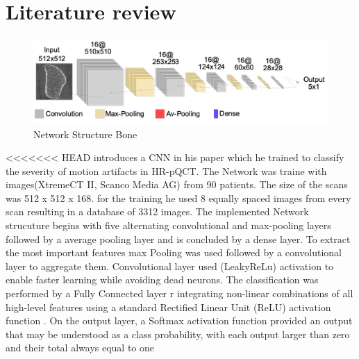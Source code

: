 \documentclass[
a4paper, 
12pt,
grayscalebody, %
abstract=on,
twoside, BCOR10mm, 12pt, DIV13,headinclude, footexclude, final, abstracton, openright
]{ibireprt}
\numberwithin{equation}{chapter}
\numberwithin{table}{chapter}
\numberwithin{figure}{chapter}
\numberwithin{algorithm}{chapter}
\numberwithin{example}{chapter}
\numberwithin{example}{chapter}
\begin{document}
\chapter{Literature review}

\begin{figure}[h]	
	\center
	\includegraphics[width = 1 \textwidth]{Bone_Network_Structure.png}%
	\caption{Network Structure Bone}
	\label{fig:fig1}
\end{figure}%

<<<<<<< HEAD
\cite{Walle2023} introduces a CNN in his paper which he trained to classify the severity of motion artifacts in HR-pQCT. The Network was traine with images(XtremeCT II, Scanco Media AG) from 90 patients. The size of the scans was 512 x 512 x 168. for the training he used 8 equally spaced images from every scan  resulting in a database of 3312 images.
The implemented Network strucuture begins with five alternating convolutional and max-pooling layers followed by a average pooling layer and is concluded by a dense layer. To extract the most important features max Pooling was used followed by a convolutional layer to aggregate them. Convolutional layer used (LeakyReLu) activation to enable faster learning while avoiding dead neurons.
 The classification was performed by a Fully Connected layer r integrating non-linear combinations of all high-level features using a standard Rectified Linear
Unit (ReLU) activation function . On the output layer, a Softmax activation function provided an output that may be understood as a class probability, with each output larger than zero and their total always equal to one
\end{document}
